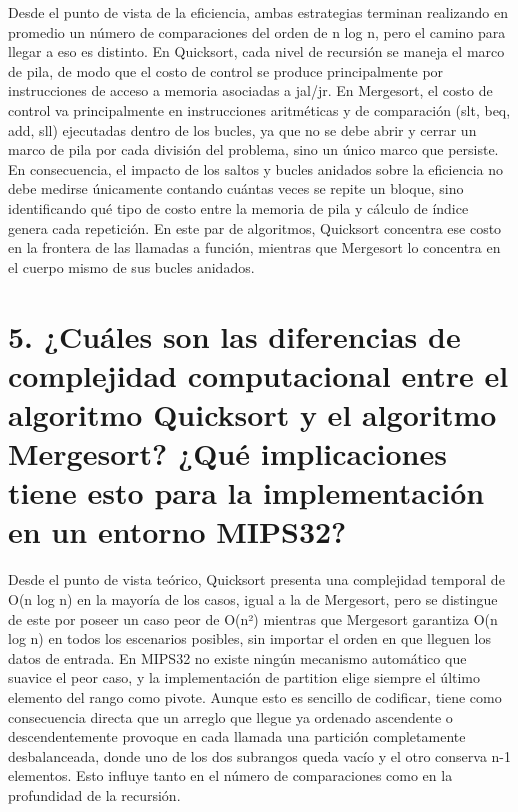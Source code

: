 \documentclass[12pt, letterpaper]{article}
\begin{document}
Desde el punto de vista de la eficiencia, ambas estrategias terminan realizando en promedio un número de comparaciones del orden de n log n, pero el camino para llegar a eso es distinto. En Quicksort, cada nivel de recursión se maneja el marco de pila, de modo que el costo de control se produce principalmente por instrucciones de acceso a memoria asociadas a jal/jr. En Mergesort, el costo de control va principalmente en instrucciones aritméticas y de comparación (slt, beq, add, sll) ejecutadas dentro de los bucles, ya que no se debe abrir y cerrar un marco de pila por cada división del problema, sino un único marco que persiste. En consecuencia, el impacto de los saltos y bucles anidados sobre la eficiencia no debe medirse únicamente contando cuántas veces se repite un bloque, sino identificando qué tipo de costo entre la memoria de pila y cálculo de índice genera cada repetición. En este par de algoritmos, Quicksort concentra ese costo en la frontera de las llamadas a función, mientras que Mergesort lo concentra en el cuerpo mismo de sus bucles anidados.\newpage

\section*{5. ¿Cuáles son las diferencias de complejidad computacional entre el algoritmo Quicksort y el algoritmo Mergesort? ¿Qué implicaciones tiene esto para la implementación en un entorno MIPS32?}

Desde el punto de vista teórico, Quicksort presenta una complejidad temporal de O(n log n) en la mayoría de los casos, igual a la de Mergesort, pero se distingue de este por poseer un caso peor de O(n²) mientras que Mergesort garantiza O(n log n) en todos los escenarios posibles, sin importar el orden en que lleguen los datos de entrada. En MIPS32 no existe ningún mecanismo automático que suavice el peor caso, y la implementación de partition elige siempre el último elemento del rango como pivote. Aunque esto es sencillo de codificar, tiene como consecuencia directa que un arreglo que llegue ya ordenado ascendente o descendentemente provoque en cada llamada una partición completamente desbalanceada, donde uno de los dos subrangos queda vacío y el otro conserva n-1 elementos. Esto influye tanto en el número de comparaciones como en la profundidad de la recursión.
\end{document}

